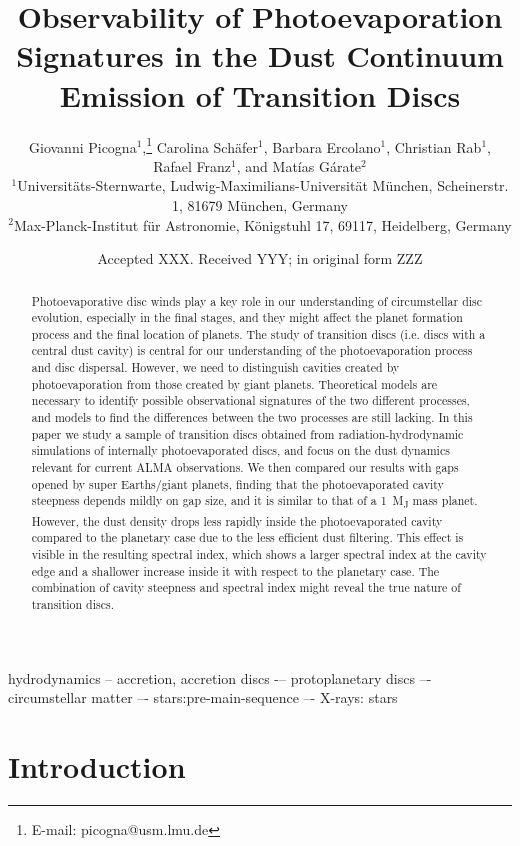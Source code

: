 \documentclass[fleqn,usenatbib]{mnras}
\title[Observability of Transition Discs]{Observability of Photoevaporation Signatures in the Dust Continuum Emission of Transition Discs}
\author[Picogna et al. 2023]{
Giovanni Picogna$^{1}$,\thanks{E-mail: picogna@usm.lmu.de}
Carolina Sch{{\"a}}fer$^{1}$,
Barbara Ercolano$^{1}$,
Christian Rab$^{1}$,
Rafael Franz$^{1}$,
and Mat\'ias G\'arate$^{2}$
\\
$^{1}$Universit\"ats-Sternwarte, Ludwig-Maximilians-Universit\"at M\"unchen, Scheinerstr. 1, 81679 M\"unchen, Germany\\
$^{2}$Max-Planck-Institut f\"ur Astronomie, K\"onigstuhl 17, 69117, Heidelberg, Germany
}
\date{Accepted XXX. Received YYY; in original form ZZZ}
\begin{document}
\label{firstpage}
\pagerange{\pageref{firstpage}--\pageref{lastpage}}
\maketitle

\begin{abstract}
Photoevaporative disc winds play a key role in our understanding of circumstellar disc evolution, especially in the final stages, and they might affect the planet formation process and the final location of planets. The study of transition discs (i.e. discs with a central dust cavity) is central for our understanding of the photoevaporation process and disc dispersal. However, we need to distinguish cavities created by photoevaporation from those created by giant planets. Theoretical models are necessary to identify possible observational signatures of the two different processes, and models to find the differences between the two processes are still lacking. In this paper we study a sample of transition discs obtained from radiation-hydrodynamic simulations of internally photoevaporated discs, and focus on the dust dynamics relevant for current ALMA observations. We then compared our results with gaps opened by super Earths/giant planets, finding that the photoevaporated cavity steepness depends mildly on gap size, and it is similar to that of a \SI{1}{M_J} mass planet. However, the dust density drops less rapidly inside the photoevaporated cavity compared to the planetary case due to the less efficient dust filtering. This effect is visible in the resulting spectral index, which shows a larger spectral index at the cavity edge and a shallower increase inside it with respect to the planetary case. The combination of cavity steepness and spectral index might reveal the true nature of transition discs.
\end{abstract}

\begin{keywords}
hydrodynamics -- accretion,  accretion discs -– protoplanetary discs –- circumstellar matter –- stars:pre-main-sequence –- X-rays: stars 
\end{keywords}



\section{Introduction}
\end{document}
